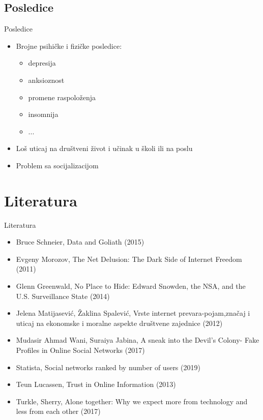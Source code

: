 \documentclass{beamer}
\begin{document}
		\subsection*{Posledice}
		\begin{frame}{Posledice}
			\begin{itemize}
				\item Brojne psihičke i fizičke posledice:
				\begin{itemize}
					\item depresija
					\item anksioznost
					\item promene raspoloženja
					\item insomnija
					\item ...
				\end{itemize}
				\item Loš uticaj na društveni život i učinak u školi ili na poslu
				\item Problem sa socijalizacijom
			\end{itemize}
		\end{frame}
		
	
	\section{Literatura}
		\begin{frame}{Literatura}
			\begin{itemize}
				\scriptsize
				\item Bruce Schneier, Data and Goliath (2015)
				\item Evgeny Morozov, The Net Delusion: The Dark Side of Internet Freedom (2011)
				\item Glenn Greenwald, No Place to Hide: Edward Snowden, the NSA, and the U.S. Surveillance State (2014)
				\item Jelena Matijasević, Žaklina Spalević, Vrste internet prevara-pojam,značaj i uticaj na ekonomske i moralne aspekte društvene zajednice (2012)
				\item Mudasir Ahmad Wani, Suraiya Jabina, A sneak into the Devil’s Colony- Fake Profiles in Online Social Networks (2017)
				\item Statista, Social networks ranked by number of users (2019)
				\item Teun Lucassen, Trust in Online Information (2013)
				\item Turkle, Sherry, Alone together: Why we expect more from technology and less from each other (2017)
				
			\end{itemize}
			
		\end{frame}
\end{document}
